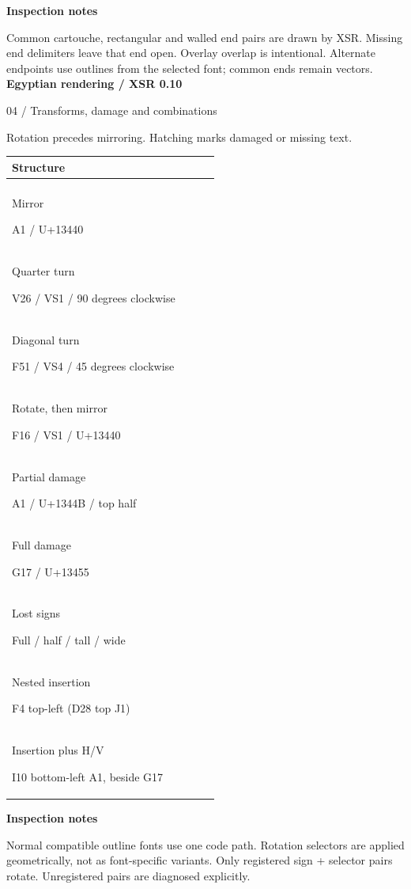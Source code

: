 \documentclass[11pt,a4paper]{article}
\makeatletter
\newcommand\sample[2]{{#1\fontsize{27}{32}\selectfont\fcolorbox{frame}{white}{#2}}}
\newenvironment{comparison}{\begin{tabular}{@{}p{46mm}*{3}{>{\centering\arraybackslash}p{37mm}}@{}}}{\end{tabular}}
\newcommand\tablehead{\textbf{Structure} & \small\NameOne & \small\NameTwo & \small\NameThree\\[7pt]\hline\\[-6pt]}
\newcommand\samplerow[3]{#1\par{\scriptsize\ttfamily #2} & \sample{\FontOne}{#3} & \sample{\FontTwo}{#3} & \sample{\FontThree}{#3}\\[15pt]}
\newenvironment{comparison}{\begin{tabular}{@{}p{57mm}*{2}{>{\centering\arraybackslash}p{51mm}}@{}}}{\end{tabular}}
\newcommand\tablehead{\textbf{Structure} & \small\NameOne & \small\NameTwo\\[7pt]\hline\\[-6pt]}
\newcommand\samplerow[3]{#1\par{\scriptsize\ttfamily #2} & \sample{\FontOne}{#3} & \sample{\FontTwo}{#3}\\[15pt]}
\makeatother
\begin{document}
{\small\color{ink}\textbf{Inspection notes}}\par\smallskip\small Common cartouche, rectangular and walled end pairs are drawn by XSR. Missing end delimiters leave that end open. Overlay overlap is intentional. Alternate endpoints use outlines from the selected font; common ends remain vectors.
\newpage
{\color{ink}\LARGE\bfseries Egyptian rendering / XSR 0.10}\par\smallskip
{\large 04 / Transforms, damage and combinations}\par\medskip
Rotation precedes mirroring. Hatching marks damaged or missing text.\par\medskip
\begin{comparison}\tablehead
\samplerow{Mirror}{A1 / U+13440}{𓀀𓑀}
\samplerow{Quarter turn}{V26 / VS1 / 90 degrees clockwise}{𓎙︀}
\samplerow{Diagonal turn}{F51 / VS4 / 45 degrees clockwise}{𓄹︃}
\samplerow{Rotate, then mirror}{F16 / VS1 / U+13440}{𓄏︀𓑀}
\samplerow{Partial damage}{A1 / U+1344B / top half}{𓀀𓑋}
\samplerow{Full damage}{G17 / U+13455}{𓅓𓑕}
\samplerow{Lost signs}{Full / half / tall / wide}{𓑃𓑄𓑅𓑆}
\samplerow{Nested insertion}{F4 top-left (D28 top J1)}{𓄂𓐲𓐷𓂓𓐺𓐍𓐸}
\samplerow{Insertion plus H/V}{I10 bottom-left A1, beside G17}{𓆓𓐳𓀀𓐱𓅓}
\end{comparison}\vfill
{\small\color{ink}\textbf{Inspection notes}}\par\smallskip\small Normal compatible outline fonts use one code path. Rotation selectors are applied geometrically, not as font-specific variants. Only registered sign + selector pairs rotate. Unregistered pairs are diagnosed explicitly.
\end{document}
